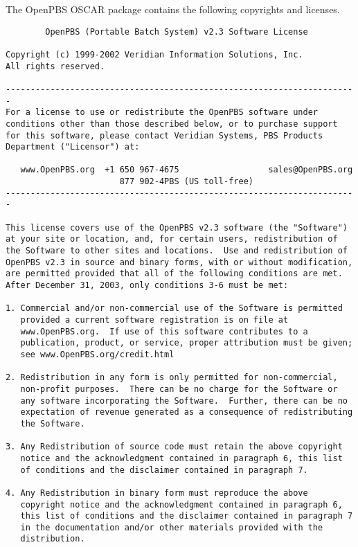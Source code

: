 The OpenPBS OSCAR package contains the following copyrights and
licenses.

\begin{verbatim}
        OpenPBS (Portable Batch System) v2.3 Software License

Copyright (c) 1999-2002 Veridian Information Solutions, Inc.
All rights reserved.

-----------------------------------------------------------------------
For a license to use or redistribute the OpenPBS software under
conditions other than those described below, or to purchase support
for this software, please contact Veridian Systems, PBS Products
Department ("Licensor") at:

   www.OpenPBS.org  +1 650 967-4675                  sales@OpenPBS.org
                       877 902-4PBS (US toll-free)
-----------------------------------------------------------------------

This license covers use of the OpenPBS v2.3 software (the "Software")
at your site or location, and, for certain users, redistribution of
the Software to other sites and locations.  Use and redistribution of
OpenPBS v2.3 in source and binary forms, with or without modification,
are permitted provided that all of the following conditions are met.
After December 31, 2003, only conditions 3-6 must be met:

1. Commercial and/or non-commercial use of the Software is permitted
   provided a current software registration is on file at
   www.OpenPBS.org.  If use of this software contributes to a
   publication, product, or service, proper attribution must be given;
   see www.OpenPBS.org/credit.html

2. Redistribution in any form is only permitted for non-commercial,
   non-profit purposes.  There can be no charge for the Software or
   any software incorporating the Software.  Further, there can be no
   expectation of revenue generated as a consequence of redistributing
   the Software.

3. Any Redistribution of source code must retain the above copyright
   notice and the acknowledgment contained in paragraph 6, this list
   of conditions and the disclaimer contained in paragraph 7.

4. Any Redistribution in binary form must reproduce the above
   copyright notice and the acknowledgment contained in paragraph 6,
   this list of conditions and the disclaimer contained in paragraph 7
   in the documentation and/or other materials provided with the
   distribution.


\end{verbatim}
